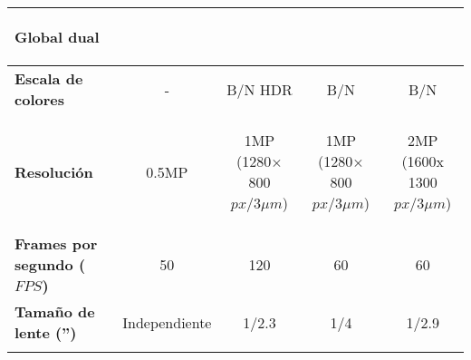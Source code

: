 \begin{itemize}
\begin{savenotes}
\begin{mytable}[H]
\begin{tabular}{l|c|c|c|c|}
			\begin{minipage}{\mythirdmaxsizeofcontenttable}\begin{myflushcenterinsidetable}
				Global dual 
			\end{myflushcenterinsidetable}\end{minipage} \\ \hline
			\multicolumn{1}{|l|}{
				\begin{minipage}{\myforthmaxsizeofcontenttable}	
					\textbf{Escala de colores}
				\end{minipage}
			} & - & B/N HDR & B/N & B/N \\ \hline
			\multicolumn{1}{|l|}{
				\begin{minipage}{\myforthmaxsizeofcontenttable}	
					\textbf{Resolución}
				\end{minipage}
			} & 0.5MP & 
			\begin{minipage}{\mythirdmaxsizeofcontenttable}\begin{myflushcenterinsidetable}
					1MP (1280× 800 $px/3{\mu}m$)
			\end{myflushcenterinsidetable}\end{minipage} & 
			\begin{minipage}{\mythirdmaxsizeofcontenttable}\begin{myflushcenterinsidetable}
					1MP (1280× 800 $px/3{\mu}m$)
			\end{myflushcenterinsidetable}\end{minipage} & 
			\begin{minipage}{\mythirdmaxsizeofcontenttable}\begin{myflushcenterinsidetable}
					2MP (1600x 1300 $px/3{\mu}m$)
			\end{myflushcenterinsidetable}\end{minipage} \\ \hline
			\multicolumn{1}{|l|}{
				\begin{minipage}{\myforthmaxsizeofcontenttable}	
					\textbf{Frames por segundo ($FPS$)}
				\end{minipage}
			} & 50 %
			& 120 & 60 & 60 \\ \hline
			\multicolumn{1}{|l|}{
				\begin{minipage}{\myforthmaxsizeofcontenttable}	
					\textbf{Tamaño de lente ('')}
				\end{minipage}
			} & Independiente & 1/2.3 & 1/4 & 1/2.9 \\ \hline
			\multicolumn{1}{|l|}{
				\begin{minipage}{\myforthmaxsizeofcontenttable}	

\end{minipage}}
\end{tabular}
\end{mytable}
\end{savenotes}
\end{itemize}
